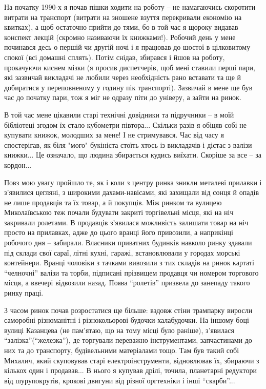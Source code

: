 На початку 1990-х я почав пішки ходити на роботу – не намагаючись скоротити
витрати на транспорт (витрати на зношене взуття перекривали економію на
квитках), а щоб остаточно прийти до тями, бо в той час я щороку видавав
конспект лекцій (скромно називаючи їх книжками!). Робочий день у мене
починався десь о першій чи другій ночі і я працював до шостої в цілковитому
спокої (всі домашні сплять). Потім снідав, збирався і йшов на роботу,
прокачуючи киснем мізки (я просив диспетчерів, щоб мені ставили перші пари,
які зазвичай викладачі не любили через необхідність рано вставати та ще й
добиратися у переповненому у годину пік транспорті). Зазвичай в мене ще був
час до початку пари, тож я міг не одразу піти до універу, а зайти на ринок. 

В той час мене цікавили старі технічні довідники та підручники – в моїй
бібліотеці згодом їх стало кубометри півтора... Скільки разів я обіцяв собі
не купувати книжок, молодших за мене! І не стримувався. Час від часу я
спостерігав, як біля "мого" букініста стоїть хтось із викладачів і дістає з
валізи книжки... Це означало, що людина збирається кудись виїхати. Скоріше
за все – за кордон...

Повз мою увагу пройшло те, як і коли з центру ринка зникли металеві прилавки
і з'явилися цегляні, з широкими дахами-навісами, які захищали від сонця й
опадів не лише продавців та їх товар, а й покупців. Між ринком та вулицею
Миколаївською теж почали будувати закриті торгівельні місця, які на ніч
закривали ролетами. В продавців з'явилася можливість залишати товар на ніч
просто на прилавках, адже до цього вранці його привозили, а наприкінці
робочого дня – забирали. Власники приватних будинків навколо ринку здавали
під склади свої сараї, літні кухні, гаражі, встановлювали у городах морські
контейнери. Вранці чоловіки з тачками вивозили з тих складів на ринок
картаті \enquote{челночні} валізи та торби, підписані прізвищем продавця чи номером
торгового місця, а ввечері відвозили назад. Поява \enquote{ролетів} призвела до
занепаду такого ринку праці.

З часом ринок почав розростатися ще більше: вздовж стіни трампарку виросли
саморобні різноманітні і різнокольорові будочки-халабудочки. На іншому боці
вулиці Казанцева (не пам'ятаю, що на тому місці було раніше), з'явилася
\enquote{залізка}(\enquote{железка}), де торгували переважно інструментами, запчастинами до
них та до транспорту, будівельними матеріалами тощо. Там був такий собі
Михалич, який скуповував старі електроінструменти, відновлював їх, збираючи
з кількох один і продавав... В нього я купував дрілі, точила, планетарні
редуктори від шурупокрутів, крокові двигуни від різної оргтехніки і інші
\enquote{скарби}...

